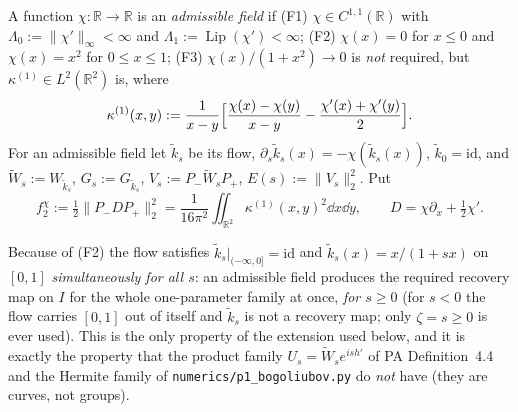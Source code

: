 \documentclass[11pt]{article}
\newcommand{\Wt}{\widetilde W}
\newcommand{\kt}{\widetilde k}
\newcommand{\Pp}{P_+}\newcommand{\Pm}{P_-}
\newcommand{\norm}[1]{\lVert#1\rVert}
\begin{document}
\begin{definition}\label{def:flow}
A function $\chi:\mathbb R\to\mathbb R$ is an \emph{admissible field} if
(F1) $\chi\in C^{1,1}(\mathbb R)$ with $\Lambda_0:=\norm{\chi'}_\infty<\infty$ and
$\Lambda_1:=\operatorname{Lip}(\chi')<\infty$;
(F2) $\chi(x)=0$ for $x\le0$ and $\chi(x)=x^2$ for $0\le x\le1$;
(F3) $\chi(x)/(1+x^2)\to0$ is \emph{not} required, but $\kappa^{(1)}\in L^2(\mathbb R^2)$ is, where
\begin{equation}\label{eq:k1}
 \kappa^{(1)}(x,y):=\frac1{x-y}\Bigl[\frac{\chi(x)-\chi(y)}{x-y}-\frac{\chi'(x)+\chi'(y)}2\Bigr].
\end{equation}
For an admissible field let $\kt_s$ be its flow, $\partial_s\kt_s(x)=-\chi(\kt_s(x))$,
$\kt_0=\mathrm{id}$, and $\Wt_s:=W_{\kt_s}$, $G_s:=G_{\kt_s}$,
$V_s:=\Pm\Wt_s\Pp$, $E(s):=\norm{V_s}_2^2$.  Put
\begin{equation}\label{eq:f2chi}
 f_2^\chi:=\tfrac12\norm{\Pm D\Pp}_2^2=\frac1{16\pi^2}\iint_{\mathbb R^2}\kappa^{(1)}(x,y)^2\dd x\dd y,
 \qquad D=\chi\partial_x+\tfrac12\chi' .
\end{equation}
\end{definition}

Because of (F2) the flow satisfies $\kt_s|_{(-\infty,0]}=\mathrm{id}$ and
$\kt_s(x)=x/(1+sx)$ on $[0,1]$ \emph{simultaneously for all $s$}: an admissible field produces the
required recovery map on $I$ for the whole one-parameter family at once, \emph{for $s\ge0$}
(for $s<0$ the flow carries $[0,1]$ out of itself and $\kt_s$ is not a recovery map; only
$\zeta=s\ge0$ is ever used).  This is the only property
of the extension used below, and it is exactly the property that the product family
$U_s=\Wt_se^{ish'}$ of PA Definition~4.4 and the Hermite family of
\texttt{numerics/p1\_bogoliubov.py} do \emph{not} have (they are curves, not groups).
\end{document}
